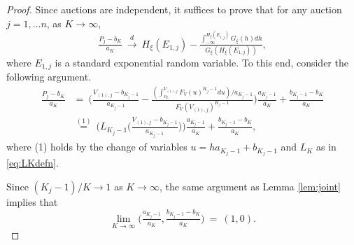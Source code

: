 \begin{proof}%
Since auctions are independent, it suffices to prove that for any auction $j=1,\ldots n$, as $K\to \infty$,
\begin{equation}
\tfrac{P_{j}-b_{K}}{a_{K}}~\overset{d}{\to }~H_{\xi }( E_{1,j}) -\tfrac{\int_{-\infty}^{H_{\xi }( E_{1,j}) }G_{\xi }(h) dh}{G_{\xi }( H_{\xi }( E_{1,j}) ) }, \label{eq:aux1}
\end{equation}%
where $E_{1,j}$ is a standard exponential random variable. 
To this end, consider the following argument.
\begin{align}
\tfrac{P_{j}-b_{K}}{a_{K}}
&=~\big( \tfrac{V_{(1),j}-b_{K_{j}-1}}{a_{K_{j}-1}}-\tfrac{( \int_{{v_L}}^{V_{(1),j}}{F_{V}(u)^{K_{j}-1}}du) /a_{K_{j}-1}}{ F_{V}(V_{(1),j})^{K_{j}-1}}\big) \tfrac{a_{K_{j}-1}}{a_{K}}+\tfrac{ b_{K_{j}-1}-b_{K}}{a_{K}} \nonumber \\
&\overset{(1)}{=}~\big( L_{K_{j}-1}\big( \tfrac{V_{(1),j}-b_{K_{j}-1}}{ a_{K_{j}-1}}\big) \big) \tfrac{a_{K_{j}-1}}{a_{K}}+\tfrac{b_{K_{j}-1}-b_{K} }{a_{K}}, \label{eq:first1}
\end{align}
where (1) holds by the change of variables $u=ha_{K_{j}-1}+b_{K_{j}-1} $ and $L_{K}$ as in \eqref{eq:LKdefn}.

Since $( K_{j}-1) /K\to 1$ as $K\to \infty $, the same argument as Lemma \ref{lem:joint} implies that
\begin{equation}
\lim_{K \to \infty}\big( \tfrac{a_{K_{j}-1}}{a_{K}},\tfrac{b_{K_{j}-1}-b_{K}}{a_{K}}\big) ~=~ ( 1,0) . \label{eq:first2}
\end{equation}


\end{proof}
